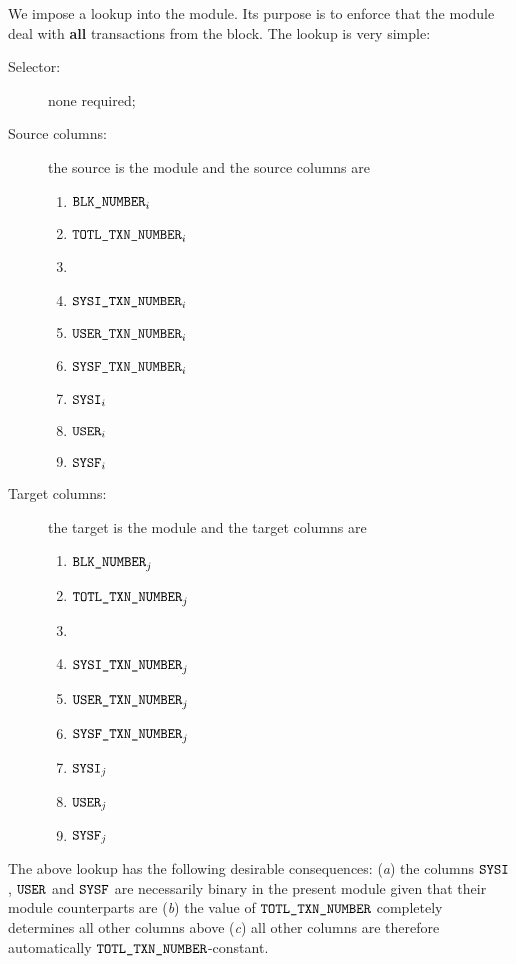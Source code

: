 We impose a lookup into the \hubMod{} module. Its purpose is to enforce that the \hubMod{} module deal with \textbf{all} transactions from the block. The lookup is very simple:
\begin{description}
	\item[Selector:]
		none required;
	\item[Source columns:]
		the source is the \userTxnDataMod{} module and the source columns are
		\begin{multicols}{3}
			\begin{enumerate}
				\item $\texttt{BLK\_NUMBER}            _{i}$
				\item $\texttt{TOTL}\texttt{\_}\texttt{TXN\_NUMBER} _{i}$
				\item[\vspace{\fill}]
				\item $\texttt{SYSI}\texttt{\_}\texttt{TXN\_NUMBER}  _{i}$
				\item $\texttt{USER}\texttt{\_}\texttt{TXN\_NUMBER}  _{i}$
				\item $\texttt{SYSF}\texttt{\_}\texttt{TXN\_NUMBER}  _{i}$
				\item $\texttt{SYSI}                   _{i}$
				\item $\texttt{USER}                   _{i}$
				\item $\texttt{SYSF}                   _{i}$
			\end{enumerate}
		\end{multicols}
	\item[Target columns:]
		the target is the \hubMod{} module and the target columns are
		\begin{multicols}{3}
			\begin{enumerate}
				\item $\texttt{BLK\_NUMBER}            _{j}$
				\item $\texttt{TOTL}\texttt{\_}\texttt{TXN\_NUMBER} _{j}$
				\item[\vspace{\fill}]
				\item $\texttt{SYSI}\texttt{\_}\texttt{TXN\_NUMBER}  _{j}$
				\item $\texttt{USER}\texttt{\_}\texttt{TXN\_NUMBER}  _{j}$
				\item $\texttt{SYSF}\texttt{\_}\texttt{TXN\_NUMBER}  _{j}$
				\item $\texttt{SYSI}                   _{j}$
				\item $\texttt{USER}                   _{j}$
				\item $\texttt{SYSF}                   _{j}$
			\end{enumerate}
		\end{multicols}
\end{description}
\saNote{} \label{user txn data: lookups: into hub: purpose and consequences}
The above lookup has the following desirable consequences:
(\emph{a}) the columns $\texttt{SYSI}$, $\texttt{USER}$ and $\texttt{SYSF}$ are necessarily binary in the present \userTxnDataMod{} module given that their \hubMod{} module counterparts are
(\emph{b}) the value of $\texttt{TOTL}\texttt{\_}\texttt{TXN\_NUMBER}$ completely determines all other columns above
(\emph{c}) all other columns are therefore automatically $\texttt{TOTL}\texttt{\_}\texttt{TXN\_NUMBER}$-constant.
